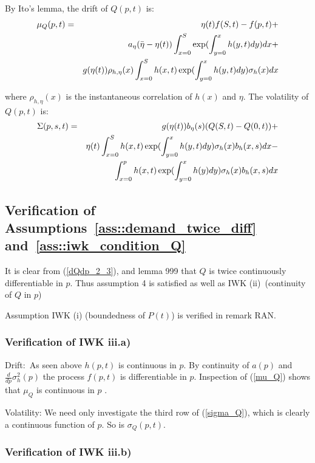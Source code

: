 \documentclass{article}
\begin{document}
By Ito's lemma, the drift of $Q(p,t)$ is:%
\begin{eqnarray}
\mu _{Q}(p,t) &=&\eta (t)f(S,t)-f(p,t)+  \label{mu_Q} \\
&&a_{\eta }(\bar{\eta}-\eta (t))\int_{x=0}^{S}\exp ({%
\int_{y=0}^{x}h(y,t)dy)dx+}  \notag \\
&&g(\eta (t))\rho _{h,\eta }(x)\int_{x=0}^{S}{h(x,t)}\exp ({%
\int_{y=0}^{x}h(y,t)dy)\sigma _{h}(x)dx}  \notag
\end{eqnarray}

where $\rho _{h,\eta }(x)$ is the instantaneous correlation of $h(x)$ and $%
\eta $.  The volatility of $Q(p,t)$ is:%
\begin{eqnarray}
\Sigma (p,s,t) &=&g(\eta (t))b_{\eta }(s)(Q(S,t)-Q(0,t))+  \label{sigma_Q} \\
&&\eta (t)\int_{x=0}^{S}{h(x,t)}\exp ({\int_{y=0}^{x}h(y,t)dy)}\sigma
_{h}(x)b_{h}(x,s)dx-  \notag \\
&&\int_{x=0}^{p}{h(x,t)}\exp ({\int_{y=0}^{x}h(y)dy)}\sigma
_{h}(x)b_{h}(x,s)dx  \notag
\end{eqnarray}

\subsection{Verification of Assumptions~\protect\ref{ass::demand_twice_diff}
and~\protect\ref{ass::iwk_condition_Q}}

It is clear from (\ref{dQdp_2_3}), and lemma 999 that $Q$ is twice
continuously differentiable in $p$. Thus assumption 4 is satisfied as well
as IWK (ii)\ (continuity of $Q$ in $p$)

Assumption IWK (i) (boundedness of $P(t)$) is verified in remark RAN.

\subsubsection{Verification of IWK iii.a)}

Drift:\ As seen above $h(p,t)$ is continuous in $p$. By continuity of $a(p)$
and $\frac{d}{dp}\sigma _{h}^{2}(p)$ the process $f(p,t)$ is differentiable
in $p$. Inspection of (\ref{mu_Q}) shows that $\mu _{Q}$ is continuous in $p$%
.

Volatility: We need only investigate the third row of (\ref{sigma_Q}), which
is clearly a continuous function of $p$. So is $\sigma _{Q}(p,t)$.

\bigskip

\subsubsection{Verification of IWK iii.b)}
\end{document}
